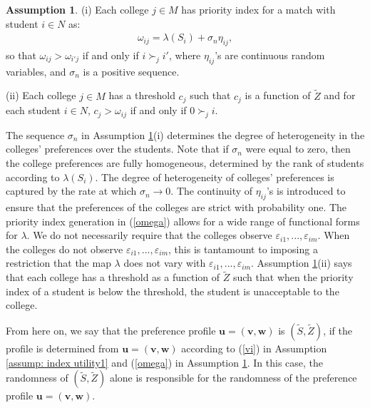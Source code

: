 \documentclass[12pt, fullpage]{amsart}
\theoremstyle{definition}
\theoremstyle{definition}
\newtheorem{assumption}{Assumption}[section]
\theoremstyle{definition}
\begin{document}
\begin{bibunit}[econometrica]
\begin{assumption}   
	\label{assump: index utility2} 
	(i) Each college $j \in M$ has priority index for a match with student $i \in N$ as:
	\begin{align}
		\label{omega}
		\omega_{ij} = \lambda(S_i) + \sigma_n \eta_{ij},
	\end{align}
    so that $\omega_{ij} > \omega_{i'j}$ if and only if $i \succ_j i'$, where $\eta_{ij}$'s are continuous random variables, and $\sigma_n$ is a positive sequence.
    
    (ii) Each college $j \in M$ has a threshold $c_{j}$ such that $c_j$ is a function of $\tilde Z$ and for each student $i \in N$, $c_{j} > \omega_{ij}$ if and only if $0 \succ_j i$.
\end{assumption}

The sequence $\sigma_n$ in Assumption \ref{assump: index utility2}(i) determines the degree of heterogeneity in the colleges' preferences over the students. Note that if $\sigma_{n}$ were equal to zero, then the college preferences are fully homogeneous, determined by the rank of students according to $\lambda(S_i)$. The degree of heterogeneity of colleges' preferences is captured by the rate at which $\sigma_n \rightarrow 0$. The continuity of $\eta_{ij}$'s is introduced to ensure that the preferences of the colleges are strict with probability one. The priority index generation in (\ref{omega}) allows for a wide range of functional forms for $\lambda$. We do not necessarily require that the colleges observe $\varepsilon_{i1},...,\varepsilon_{im}$. When the colleges do not observe $\varepsilon_{i1},...,\varepsilon_{im}$, this is tantamount to imposing a restriction that the map $\lambda$ does not vary with $\varepsilon_{i1},...,\varepsilon_{im}$. Assumption \ref{assump: index utility2}(ii) says that each college has a threshold as a function of $\tilde Z$ such that when the priority index of a student is below the threshold, the student is unacceptable to the college.

From here on, we say that the preference profile $\boldsymbol{u} = (\boldsymbol{v},\boldsymbol{w})$ is  $(\tilde S,\tilde Z)$, if the profile is determined from $\boldsymbol{u} = (\boldsymbol{v},\boldsymbol{w})$ according to (\ref{vi}) in Assumption \ref{assump: index utility1} and (\ref{omega}) in Assumption \ref{assump: index utility2}. In this case, the randomness of $(\tilde S,\tilde Z)$ alone is responsible for the randomness of the preference profile $\boldsymbol{u} = (\boldsymbol{v},\boldsymbol{w})$.


\end{bibunit}
\end{document}
